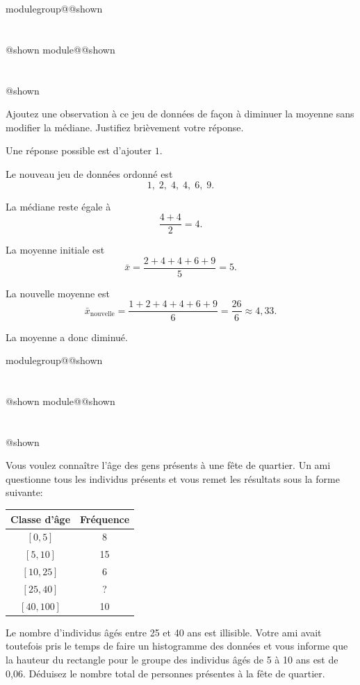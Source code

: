 \documentclass{Evaluation}
\makeatletter
\newcommand{\currentmodulekey}{}
\newcommand{\currentmoduletitle}{}
\newcommand{\currentgroupkey}{}
\newcommand{\currentgrouptitle}{}
\newcommand{\showmoduleifneeded}{%
  \ifx\currentgroupkey\empty\else
    \expandafter\ifx\csname modulegroup@\currentgroupkey @shown\endcsname\relax
      \section*{\currentgrouptitle}%
      \expandafter\gdef\csname modulegroup@\currentgroupkey @shown\endcsname{1}%
    \fi
  \fi
  \expandafter\ifx\csname module@\currentmodulekey @shown\endcsname\relax
    \section*{\currentmoduletitle}%
    \expandafter\gdef\csname module@\currentmodulekey @shown\endcsname{1}%
  \fi
}
\newenvironment{H26r}{\showmoduleifneeded}{}
\makeatother
\begin{document}
\begin{questions}
\begin{H26r}
Ajoutez une observation à ce jeu de données de façon à diminuer la moyenne sans modifier la médiane. Justifiez brièvement votre réponse.

\begin{solution}
Une réponse possible est d'ajouter \(1\).

Le nouveau jeu de données ordonné est
\[
1,\;2,\;4,\;4,\;6,\;9.
\]

La médiane reste égale à
\[
\frac{4+4}{2}=4.
\]

La moyenne initiale est
\[
\bar{x}=\frac{2+4+4+6+9}{5}=5.
\]

La nouvelle moyenne est
\[
\bar{x}_{\text{nouvelle}}=\frac{1+2+4+4+6+9}{6}
=
\frac{26}{6}
\approx 4{,}33.
\]

La moyenne a donc diminué.
\end{solution}
\end{H26r}

\begin{H26r}
\question {} %

Vous voulez connaître l'âge des gens présents à une fête de quartier. Un ami questionne tous les individus présents et vous remet les résultats sous la forme suivante: 

\begin{table}[h!]
\begin{center}
\begin{tabular}{c|c}
Classe d'âge & Fréquence \\
\hline
$[0,5]$ & 8 \\
$[5,10]$ & 15 \\
$[10, 25]$ & 6 \\
$[25, 40]$ & ? \\
$[40, 100]$ & 10 
\end{tabular}
\end{center}
\end{table}

Le nombre d'individus âgés entre 25 et 40 ans est illisible. Votre ami avait toutefois pris le temps de faire un histogramme des données et vous informe que la hauteur du rectangle pour le groupe des individus âgés de 5 à 10 ans est de 0,06. Déduisez le nombre total de personnes présentes à la fête de quartier. 


\end{H26r}
\end{questions}
\end{document}
